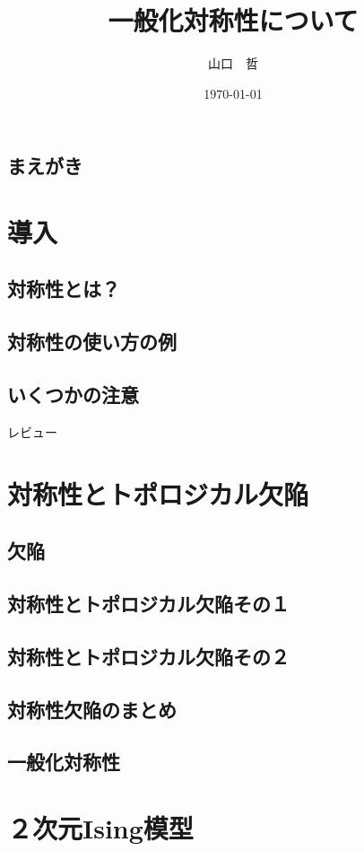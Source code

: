 \documentclass[report,paper=a4, fontsize=12pt, line_length=16cm, number_of_lines=33,dvipdfmx]{jlreq}
\title{一般化対称性について}
\author{山口　哲}
\date{\today}
\numberwithin{equation}{chapter}
\begin{document}
\maketitle
\tableofcontents

\section*{まえがき}

\chapter{導入}
\section{対称性とは？}
\section{対称性の使い方の例}
\section{いくつかの注意}

レビュー\cite{Shao:2023gho}

\chapter{対称性とトポロジカル欠陥}
\section{欠陥}
\section{対称性とトポロジカル欠陥その１}
\section{対称性とトポロジカル欠陥その２}
\section{対称性欠陥のまとめ}
\section{一般化対称性}



\chapter{２次元Ising模型}
\end{document}
